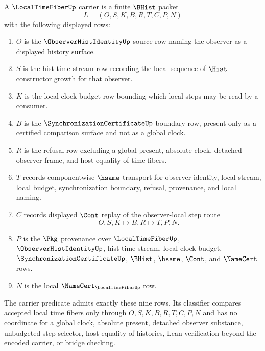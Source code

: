 \begin{definition}
\label{def:local-time-fiber-carrier}
A $\LocalTimeFiberUp$ carrier is a finite $\BHist$ packet
$$
L=(O,S,K,B,R,T,C,P,N)
$$
with the following displayed rows:
\begin{enumerate}
\item $O$ is the $\ObserverHistIdentityUp$ source row naming the observer as a displayed history surface.
\item $S$ is the hist-time-stream row recording the local sequence of $\Hist$ constructor growth for that observer.
\item $K$ is the local-clock-budget row bounding which local steps may be read by a consumer.
\item $B$ is the $\SynchronizationCertificateUp$ boundary row, present only as a certified comparison surface and not as a global clock.
\item $R$ is the refusal row excluding a global present, absolute clock, detached observer frame, and host equality of time fibers.
\item $T$ records componentwise $\hsame$ transport for observer identity, local stream, local budget, synchronization boundary, refusal, provenance, and local naming.
\item $C$ records displayed $\Cont$ replay of the observer-local step route
$$
O,S,K \longmapsto B,R \longmapsto T,P,N .
$$
\item $P$ is the $\Pkg$ provenance over $\LocalTimeFiberUp$, $\ObserverHistIdentityUp$, hist-time-stream, local-clock-budget, $\SynchronizationCertificateUp$, $\BHist$, $\hsame$, $\Cont$, and $\NameCert$ rows.
\item $N$ is the local $\NameCert_{\LocalTimeFiberUp}$ row.
\end{enumerate}
The carrier predicate admits exactly these nine rows. Its classifier compares accepted local time fibers only through $O,S,K,B,R,T,C,P,N$ and has no coordinate for a global clock, absolute present, detached observer substance, unbudgeted step selector, host equality of histories, Lean verification beyond the encoded carrier, or bridge checking.
\end{definition}

